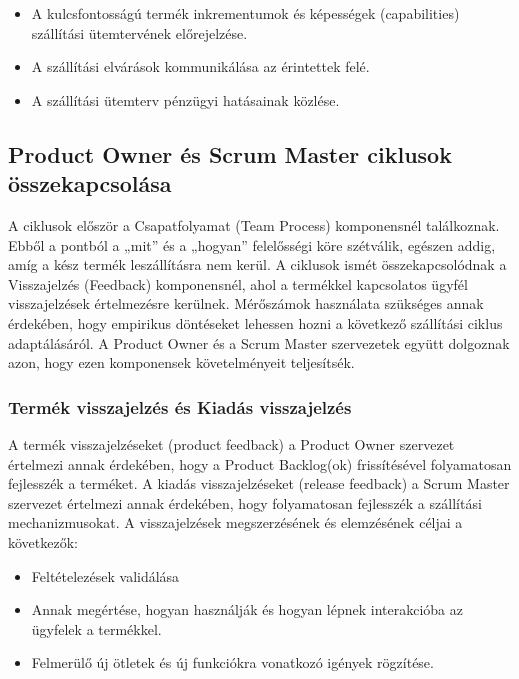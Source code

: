 \documentclass[12pt,a4paper,parskip=full]{scrartcl}
\begin{document}
\begin{itemize}
\itemsep1pt\parskip0pt
\item
 A kulcsfontosságú termék inkrementumok és képességek (capabilities) szállítási ütemtervének előrejelzése.
\item
 A szállítási elvárások kommunikálása az érintettek felé.
\item
 A szállítási ütemterv pénzügyi hatásainak közlése.
\end{itemize}

\subsection{Product Owner és Scrum Master ciklusok összekapcsolása}\label{Connecting-the-product-owner-and-scrum-master-cycles}

A ciklusok először a Csapatfolyamat (Team Process) komponensnél találkoznak. Ebből a pontból a „mit” és a „hogyan” felelősségi köre szétválik, egészen addig, amíg a kész termék leszállításra nem kerül. A ciklusok ismét összekapcsolódnak a Visszajelzés (Feedback) komponensnél, ahol a termékkel kapcsolatos ügyfél visszajelzések értelmezésre kerülnek. Mérőszámok használata szükséges annak érdekében, hogy empirikus döntéseket lehessen hozni a következő szállítási ciklus adaptálásáról. A Product Owner és a Scrum Master szervezetek együtt dolgoznak azon, hogy ezen komponensek követelményeit teljesítsék.

\subsubsection{Termék visszajelzés és Kiadás visszajelzés}\label{product-feedback-and-release-feedback}

A termék visszajelzéseket (product feedback) a Product Owner szervezet értelmezi annak érdekében, hogy a Product Backlog(ok) frissítésével folyamatosan fejlesszék a terméket. A kiadás visszajelzéseket (release feedback) a Scrum Master szervezet értelmezi annak érdekében, hogy folyamatosan fejlesszék a szállítási mechanizmusokat. A visszajelzések megszerzésének és elemzésének céljai a következők:

\begin{itemize}
\itemsep1pt\parskip0pt
\item
 Feltételezések validálása
\item
 Annak megértése, hogyan használják és hogyan lépnek interakcióba az ügyfelek a termékkel.
\item
 Felmerülő új ötletek és új funkciókra vonatkozó igények rögzítése.
\end{itemize}
\end{document}
